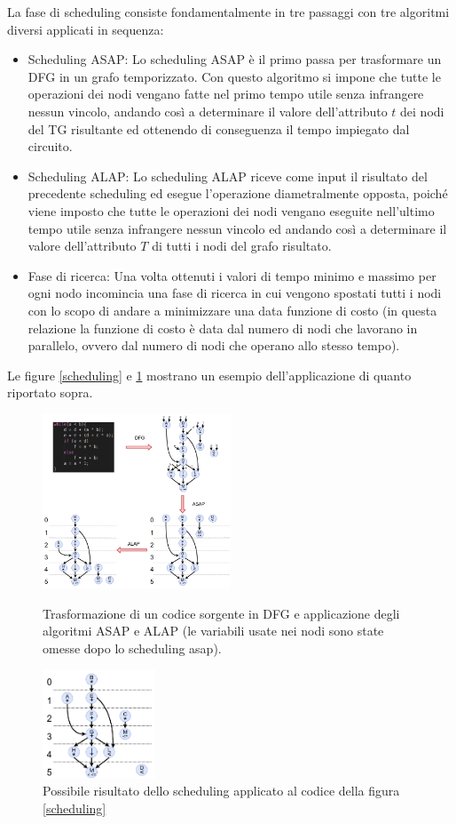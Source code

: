 \documentclass[]{IEEEtran}
\begin{document}
La fase di scheduling consiste fondamentalmente in tre passaggi con tre algoritmi diversi applicati in sequenza:
\begin{itemize}
	\item  Scheduling ASAP: Lo scheduling ASAP è il primo passa per trasformare un DFG in un grafo temporizzato. Con questo algoritmo si impone che tutte le operazioni dei nodi vengano fatte nel primo tempo utile senza infrangere nessun vincolo, andando così a determinare il valore dell'attributo $t$ dei nodi del TG risultante ed ottenendo di conseguenza il tempo impiegato dal circuito.
	\item Scheduling ALAP: Lo scheduling ALAP riceve come input il risultato del precedente scheduling ed esegue l'operazione diametralmente opposta, poiché viene imposto che tutte le operazioni dei nodi vengano eseguite nell'ultimo tempo utile senza infrangere nessun vincolo ed andando così a determinare il valore dell'attributo $T$ di tutti i nodi del grafo risultato.
	\item Fase di ricerca: Una volta ottenuti i valori di tempo minimo e massimo per ogni nodo incomincia una fase di ricerca in cui vengono spostati tutti i nodi con lo scopo di andare a minimizzare una data funzione di costo (in questa relazione la funzione di costo è data dal numero di nodi che lavorano in parallelo, ovvero dal numero di nodi che operano allo stesso tempo).
\end{itemize}
Le figure \ref{scheduling} e \ref{scheduling2} mostrano un esempio dell'applicazione di quanto riportato sopra.
\begin{figure}[htp]
	\includegraphics[width=0.5\textwidth]{images/schedule.png}
	\caption{Trasformazione di un codice sorgente in DFG e applicazione degli algoritmi ASAP e ALAP (le variabili usate nei nodi sono state omesse dopo lo scheduling asap).}
	\label{scheduling}
	\includegraphics[width=0.3\textwidth]{images/scheduling2.png}
	\caption{Possibile risultato dello scheduling applicato al codice della figura \ref{scheduling}}
	\label{scheduling2}
\end{figure}
\end{document}
